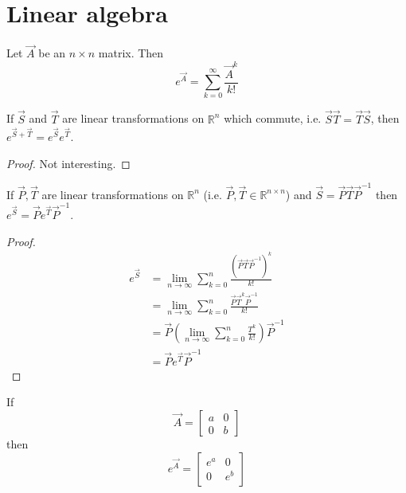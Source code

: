 \section{Linear algebra}
\begin{definition}
	Let $\vec A$ be an $n \times n$ matrix. Then
	\begin{equation}
		e^{\vec A} = \sum_{k = 0}^\infty \frac{\vec A^k}{k!}
	\end{equation}
\end{definition}

\begin{proposition} %
	\label{prop:la:commute}
	If $\vec S$ and $\vec T$ are linear transformations on $\mathbb R^n$ which commute, i.e. $\vec S \vec T = \vec T \vec S$, then $e^{\vec S + \vec T} = e^{\vec S}e^{\vec T}$.
\end{proposition}

\begin{proof}
	Not interesting.
\end{proof}

\begin{proposition} %
	\label{prop:la:ptp}
	If $\vec P, \vec T$ are linear transformations on $\mathbb R^n$ (i.e. $\vec P, \vec T \in \mathbb R^{n \times n}$) and $\vec S = \vec P \vec T \vec P^{-1}$ then $e^{\vec S} = \vec P e^{\vec T} \vec P^{-1}$.
\end{proposition}

\begin{proof}
	\begin{align*}
		e^{\vec S} 	&= \lim_{n \to \infty} \sum_{k = 0}^n \frac{(\vec P \vec T \vec P^{-1})^k}{k!} \\
						&= \lim_{n \to \infty} \sum_{k = 0}^n \frac{\vec P \vec T^k \vec P^{-1}}{k!} \\
						&= \vec P \left(\lim_{n \to \infty} \sum_{k = 0}^n \frac{T^k}{k!} \right) \vec P^{-1} \\
						&= \vec P e^{\vec T} \vec P^{-1}
	\end{align*}
\end{proof}

\begin{proposition}
	\label{prop:la:distinct}
	If
	\begin{equation*}
		\vec A =
		\begin{bmatrix}
			a & 0 \\
			0 & b
		\end{bmatrix}
	\end{equation*}
	then
	\begin{equation*}
		e^{\vec A} =
		\begin{bmatrix}
			e^a & 0 \\
			0 & e^b
		\end{bmatrix}
	\end{equation*}
\end{proposition}

